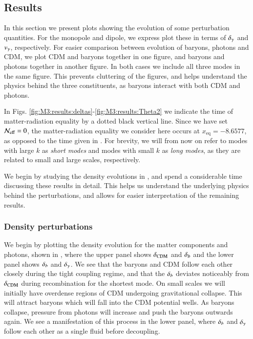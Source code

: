 \subsection{Results}\label{ssec:M3:results}

In this section we present plots showing the evolution of some perturbation quantities. For the monopole and dipole, we express plot these in terms of $\delta_\gamma$ and $v_\gamma$, respectively. For easier comparison between evolution of baryons, photons and CDM, we plot CDM and baryons together in one figure, and baryons and photons together in another figure. In both cases we include all three modes in the same figure. This prevents cluttering of the figures, and helps understand the physics behind the three constituents, as baryons interact with both CDM and photons. 

In Figs. \ref{fig:M3:results:deltas}-\ref{fig:M3:results:Theta2} we indicate the time of matter-radiation equality by a dotted black vertical line. Since we have set $\mathcal{N}_\mathrm{eff}=0$, the matter-radiation equality we consider here occurs at $x_\mathrm{eq}=-8.6577$, as opposed to the time given in . For brevity, we will from now on refer to modes with large $k$ as \textit{short modes} and modes with small $k$ as \textit{long modes}, as they are related to small and large scales, respectively. 

We begin by studying the density evolutions in , and spend a considerable time discussing these results in detail. This helps us understand the underlying physics behind the perturbations, and allows for easier interpretation of the remaining results. 

\subsubsection{Density perturbations} \label{sssec:M3:results:density_perturbations}
We begin by plotting the density evolution for the matter components and photons, shown in , where the upper panel shows $\delta_\mathrm{CDM}$ and $\delta_b$ and the lower panel shows $\delta_b$ and $\delta_\gamma$. We see that the baryons and CDM follow each other closely during the tight coupling regime, and that the $\delta_b$ deviates noticeably from $\delta_\mathrm{CDM}$ during recombination for the shortest mode. On small scales we will initially have overdense regions of CDM undergoing gravitational collapse. This will attract baryons which will fall into the CDM potential wells. As baryons collapse, pressure from photons will increase and push the baryons outwards again. We see a manifestation of this process in the lower panel, where $\delta_b$ and $\delta_\gamma$ follow each other as a single fluid before decoupling. 

